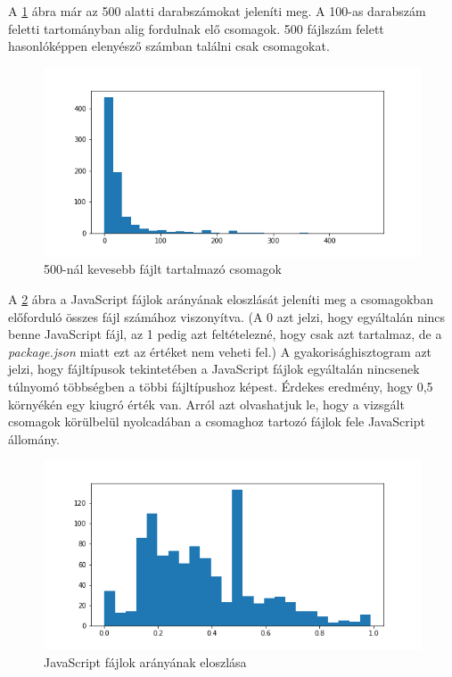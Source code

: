 A \ref{fig:hist_2} ábra már az 500 alatti darabszámokat jeleníti meg. A 100-as darabszám feletti tartományban alig fordulnak elő csomagok. 500 fájlszám felett hasonlóképpen elenyésző számban találni csak csomagokat.

\begin{figure}[!h]
	\centering
	\includegraphics[scale=0.7]{images/hist_2.png}
	\caption{500-nál kevesebb fájlt tartalmazó csomagok}
	\label{fig:hist_2}
\end{figure}

A \ref{fig:hist_3} ábra a JavaScript fájlok arányának eloszlását jeleníti meg a csomagokban előforduló összes fájl számához viszonyítva. (A 0 azt jelzi, hogy egyáltalán nincs benne JavaScript fájl, az 1 pedig azt feltételezné, hogy csak azt tartalmaz, de a \emph{package.json} miatt ezt az értéket nem veheti fel.) A gyakorisághisztogram azt jelzi, hogy fájltípusok tekintetében a JavaScript fájlok egyáltalán nincsenek túlnyomó többségben a többi fájltípushoz képest. Érdekes eredmény, hogy 0,5 környékén egy kiugró érték van. Arról azt olvashatjuk le, hogy a vizsgált csomagok körülbelül nyolcadában a csomaghoz tartozó fájlok fele JavaScript állomány.

\begin{figure}[!h]
	\centering
	\includegraphics[scale=0.7]{images/hist_3.png}
	\caption{JavaScript fájlok arányának eloszlása}
	\label{fig:hist_3}
\end{figure}

